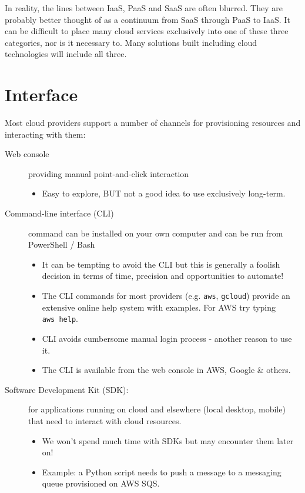 In reality, the lines between IaaS, PaaS and SaaS are often blurred.
They are probably better thought of as a continuum from SaaS through PaaS to IaaS.
It can be difficult to place many cloud services exclusively into one of these three categories, nor is it necessary to.
Many solutions built including cloud technologies will include all three.


\section{Interface}
\label{sec:interface}

Most cloud providers support a number of channels for provisioning resources and interacting with them:

\begin{description}
\item[Web console]
providing manual point-and-click interaction

\begin{itemize}

\item
  Easy to explore, BUT not a good idea to use exclusively long-term.
\end{itemize}
\item[Command-line interface (CLI)]
command can be installed on your own computer and can be run from
PowerShell / Bash

\begin{itemize}
\item
  It can be tempting to avoid the CLI but this is generally a foolish
  decision in terms of time, precision and opportunities to automate!
\item
  The CLI commands for most providers (e.g. \texttt{aws},
  \texttt{gcloud}) provide an extensive online help system with
  examples. For AWS try typing \texttt{aws\ help}.
\item
  CLI avoids cumbersome manual login process - another reason to use it.
\item
  The CLI is available from the web console in AWS, Google \& others.
\end{itemize}

\item[Software Development Kit (SDK):]
for applications running on cloud and elsewhere (local desktop, mobile)
that need to interact with cloud resources.

\begin{itemize}
\item
  We won't spend much time with SDKs but may encounter them later on!
\item
  Example: a Python script needs to push a message to a messaging queue
  provisioned on AWS SQS.
\end{itemize}
\end{description}




